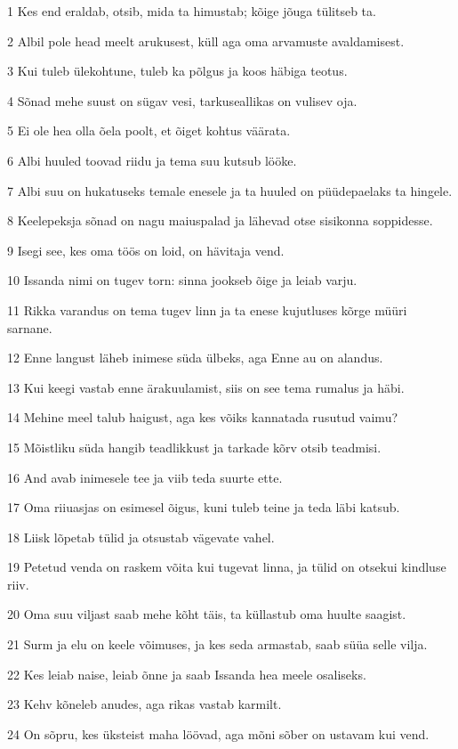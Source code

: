 \par 1 Kes end eraldab, otsib, mida ta himustab; kõige jõuga tülitseb ta.
\par 2 Albil pole head meelt arukusest, küll aga oma arvamuste avaldamisest.
\par 3 Kui tuleb ülekohtune, tuleb ka põlgus ja koos häbiga teotus.
\par 4 Sõnad mehe suust on sügav vesi, tarkuseallikas on vulisev oja.
\par 5 Ei ole hea olla õela poolt, et õiget kohtus väärata.
\par 6 Albi huuled toovad riidu ja tema suu kutsub lööke.
\par 7 Albi suu on hukatuseks temale enesele ja ta huuled on püüdepaelaks ta hingele.
\par 8 Keelepeksja sõnad on nagu maiuspalad ja lähevad otse sisikonna soppidesse.
\par 9 Isegi see, kes oma töös on loid, on hävitaja vend.
\par 10 Issanda nimi on tugev torn: sinna jookseb õige ja leiab varju.
\par 11 Rikka varandus on tema tugev linn ja ta enese kujutluses kõrge müüri sarnane.
\par 12 Enne langust läheb inimese süda ülbeks, aga Enne au on alandus.
\par 13 Kui keegi vastab enne ärakuulamist, siis on see tema rumalus ja häbi.
\par 14 Mehine meel talub haigust, aga kes võiks kannatada rusutud vaimu?
\par 15 Mõistliku süda hangib teadlikkust ja tarkade kõrv otsib teadmisi.
\par 16 And avab inimesele tee ja viib teda suurte ette.
\par 17 Oma riiuasjas on esimesel õigus, kuni tuleb teine ja teda läbi katsub.
\par 18 Liisk lõpetab tülid ja otsustab vägevate vahel.
\par 19 Petetud venda on raskem võita kui tugevat linna, ja tülid on otsekui kindluse riiv.
\par 20 Oma suu viljast saab mehe kõht täis, ta küllastub oma huulte saagist.
\par 21 Surm ja elu on keele võimuses, ja kes seda armastab, saab süüa selle vilja.
\par 22 Kes leiab naise, leiab õnne ja saab Issanda hea meele osaliseks.
\par 23 Kehv kõneleb anudes, aga rikas vastab karmilt.
\par 24 On sõpru, kes üksteist maha löövad, aga mõni sõber on ustavam kui vend.

